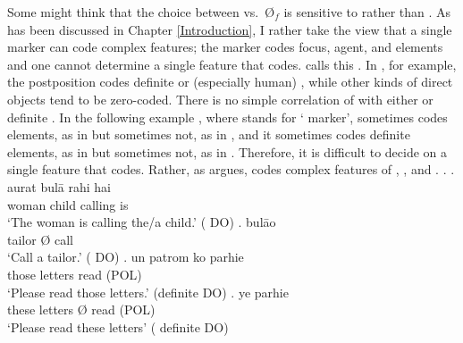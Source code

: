 Some might think that the choice between  vs.\ {\O$_{f}$} is sensitive to  rather than .
As has been discussed in Chapter \ref{Introduction}, I rather take the view that a single marker can code complex features;
the marker  codes focus, agent, and  elements
and one cannot determine a single feature that  codes.
 calls this .
In ,
for example,
the postposition  codes definite or  (especially human) ,
while other kinds of direct objects tend to be zero-coded.
There is no simple correlation of  with either  or definite .
In the following example \Next,
where  stands for ` marker',
sometimes  codes  elements, as in \Next[a] but sometimes not, as in \Next[c],
and it sometimes codes definite elements, as in \Next[c] but sometimes not, as in \Next[a,d].
Therefore,
it is difficult to decide on a single feature that  codes.
Rather,
as  argues,
 codes complex features of , , and .
\ex.
 \ag. aurat   bul\={a} rahi hai \\
	woman child  calling  is \\
	`The woman is calling the/a child.' \hfill{( DO)}
 \bg.  \EM{\O} bul\={a}o \\
	tailor {\O} call \\
	`Call a tailor.' \hfill{(  DO)}
 \bg. un patrom ko parhie \\
	those letters  read (POL) \\
	`Please read those letters.' \hfill{(definite DO)}
 \bg. ye  \EM{\O} parhie \\
	these letters {\O} read (POL) \\
	`Please read these letters' \hfill{( definite DO)}
\begin{flushright}
\cite[][p.\ 48]{mcgregor72}
\end{flushright}


